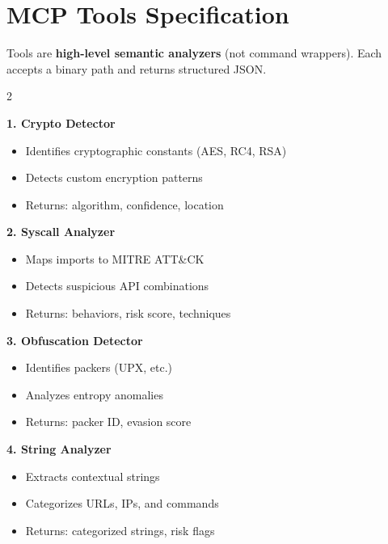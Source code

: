 \documentclass[11pt,a4paper]{article}
\begin{document}
\section{MCP Tools Specification}

\noindent Tools are \textbf{high-level semantic analyzers} (not command wrappers). Each accepts a binary path and returns structured JSON.

\vspace{0.4em}
\begin{multicols}{2}

\noindent\textbf{1. Crypto Detector}
\begin{itemize}
  \item Identifies cryptographic constants (AES, RC4, RSA)
  \item Detects custom encryption patterns
  \item Returns: algorithm, confidence, location
\end{itemize}

\noindent\textbf{2. Syscall Analyzer}
\begin{itemize}
  \item Maps imports to MITRE ATT\&CK
  \item Detects suspicious API combinations
  \item Returns: behaviors, risk score, techniques
\end{itemize}

\columnbreak

\noindent\textbf{3. Obfuscation Detector}
\begin{itemize}
  \item Identifies packers (UPX, etc.)
  \item Analyzes entropy anomalies
  \item Returns: packer ID, evasion score
\end{itemize}

\noindent\textbf{4. String Analyzer}
\begin{itemize}
  \item Extracts contextual strings
  \item Categorizes URLs, IPs, and commands
  \item Returns: categorized strings, risk flags
\end{itemize}

\end{multicols}
\end{document}
